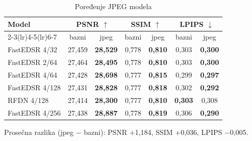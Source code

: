 \begin{table}[H]
    \begin{tabular}{lcccccc}
        \toprule
        Model & \multicolumn{2}{c}{PSNR $\uparrow$} & \multicolumn{2}{c}{SSIM $\uparrow$} & \multicolumn{2}{c}{LPIPS $\downarrow$} \\
        \cmidrule(lr){2-3}\cmidrule(lr){4-5}\cmidrule(lr){6-7}
         & bazni & jpeg & bazni & jpeg & bazni & jpeg \\
        \midrule
        FastEDSR 4/32 & 27,459 & \textbf{28,529} & 0,778 & \textbf{0,810} & 0,303 & \textbf{0,300} \\
        FastEDSR 2/64 & 27,464 & \textbf{28,495} & 0,778 & \textbf{0,810} & 0,303 & \textbf{0,300} \\
        FastEDSR 4/64 & 27,428 & \textbf{28,698} & 0,777 & \textbf{0,815} & 0,299 & \textbf{0,297} \\
        FastEDSR 4/128 & 27,431 & \textbf{28,828} & 0,777 & \textbf{0,818} & 0,302 & \textbf{0,292} \\
        RFDN 4/128 & 27,414 & \textbf{28,300} & 0,777 & \textbf{0,810} & \textbf{0,303} & 0,308 \\
        FastEDSR 4/256 & 27,438 & \textbf{28,887} & 0,778 & \textbf{0,819} & 0,306 & \textbf{0,290} \\
        \bottomrule
    \end{tabular}
    \caption{Poređenje JPEG modela}
    \label{tab:jpeg_DIV2K_jpeg45}
\end{table}

\noindent Prosečna razlika (jpeg $-$ bazni): PSNR $+$1,184, SSIM $+$0,036, LPIPS $-$0,005.